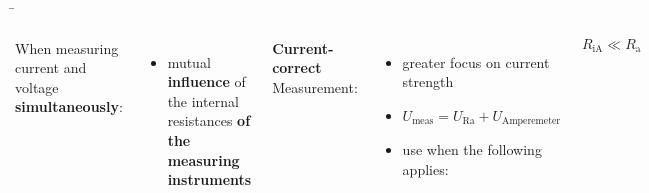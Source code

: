 \begin{frame}
{	}

	\b{

		\begin{columns}
		 When measuring current and voltage \textbf{simultaneously}:
		 \begin{itemize}
			\item mutual \textbf{influence} of the internal resistances \textbf{of the measuring instruments}
		 \end{itemize}


		 \vspace{5pt}
			
		 \textbf{Current-correct} Measurement:

		 \begin{itemize}
			\item greater focus on current strength
			\item $U_\mathrm{meas} = U_\mathrm{Ra} + U_\mathrm{Amperemeter}$ 
			\item use when the following applies:
		\end{itemize}
		
		\begin{equation*}
			R_{\mathrm{iA}} \ll R_{\mathrm{a}}
		\end{equation*}

	

 
 


\end{columns}}
\end{frame}
